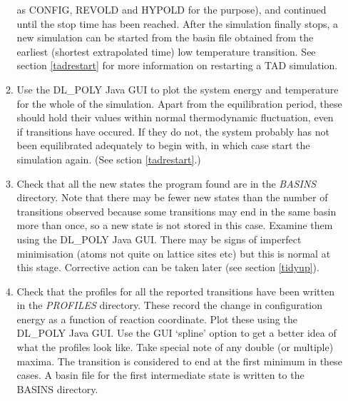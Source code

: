 \begin{enumerate}
\begin{enumerate}
  as CONFIG, REVOLD and HYPOLD for the purpose), and continued
  until the stop time has been reached. After the simulation finally stops,
  a new simulation can be started from the basin file obtained from
  the earliest (shortest extrapolated time) low temperature
  transition. See section \ref{tadrestart} for more information on
  restarting a TAD simulation.
\item Use the DL\_POLY Java GUI to plot the system energy and temperature
  for the whole of the simulation. Apart from the equilibration period,
  these should hold their values within normal thermodynamic fluctuation, 
  even if transitions have occured. If they do not, the system probably 
  has not been equilibrated adequately to begin with, in which case
  start the simulation again. (See sction \ref{tadrestart}.)
\item Check that all the new states the program found are in 
  the {\em BASINS} directory. Note that there may be fewer new states
  than the number of transitions observed because some transitions
  may end in the same basin more than once, so a new state is not
  stored in this case. Examine them using the DL\_POLY Java
  GUI. There may be signs of imperfect minimisation (atoms not quite on
  lattice sites etc) but this is normal at this stage. Corrective
  action can be taken later (see section \ref{tidyup}).
\item Check that the profiles for all the reported transitions have been
  written in the {\em PROFILES} directory. These record the change in
  configuration energy as a function of reaction coordinate.  Plot
  these using the DL\_POLY Java GUI. Use the GUI `spline' option to
  get a better idea of what the profiles look like. Take special note
  of any double (or multiple) maxima. The transition is considered to
  end at the first minimum in these cases. A basin file for the first
  intermediate state is written to the BASINS directory.
\end{enumerate}


\end{enumerate}
